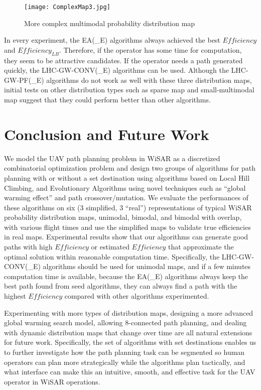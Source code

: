 \begin{figure}
\centering
\texttt{[image: ComplexMap3.jpg]}
\caption{More complex multimodal probability distribution map}
\label{ComplexMap}
\end{figure}

In every experiment, the EA(\_E) algorithms always achieved the best $\mathit{Efficiency}$ and $\mathit{Efficiency_{LB}}$. Therefore, if the operator has some time for computation, they seem to be attractive candidates. If the operator needs a path generated quickly, the LHC-GW-CONV(\_E) algorithms can be used. Although the LHC-GW-PF(\_E) algorithms do not work as well with these three distribution maps, initial tests on other distribution types such as sparse map and small-multimodal map suggest that they could perform better than other algorithms.


\section{Conclusion and Future Work}

We model the UAV path planning problem in WiSAR as a discretized combinatorial optimization problem and design two groups of algorithms for path planning with or without a set destination using algorithms based on Local Hill Climbing, and Evolutionary Algorithms using novel techniques such as ``global warming effect'' and path crossover/mutation. We evaluate the performances of these algorithms on six (3 simplified, 3 ``real'') representations of typical WiSAR probability distribution maps, unimodal, bimodal, and bimodal with overlap, with various flight times and use the simplified maps to validate true efficiencies in real maps. Experimental results show that our algorithms can generate good paths with high $\mathit{Efficiency}$ or estimated $\mathit{Efficiency}$ that approximate the optimal solution within reasonable computation time. Specifically, the LHC-GW-CONV(\_E) algorithms should be used for unimodal maps, and if a few minutes computation time is available, because the EA(\_E) algorithms always keep the best path found from seed algorithms, they can always find a path with the highest $\mathit{Efficiency}$ compared with other algorithms experimented.

Experimenting with more types of distribution maps, designing a more advanced global warming search model, allowing 8-connected path planning, and dealing with dynamic distribution maps that change over time are all natural extensions for future work. Specifically, the set of algorithms with set destinations enables us to further investigate how the path planning task can be segmented so human operators can plan more strategically while the algorithms plan tactically, and what interface can make this an intuitive, smooth, and effective task for the UAV operator in WiSAR operations.
